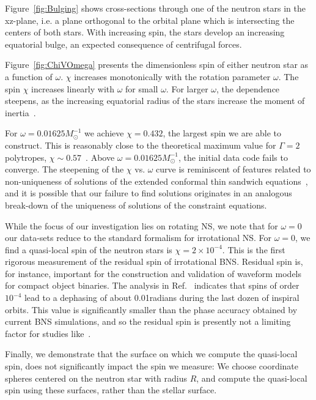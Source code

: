 {Figure~\ref{fig:Bulging} shows cross-sections through one of the neutron stars
in the xz-plane, i.e. a plane orthogonal to the orbital plane which is
intersecting the centers of both stars.  With increasing spin, the
stars develop an increasing equatorial bulge, an expected consequence of centrifugal forces. 

Figure~\ref{fig:ChiVOmega}
presents the dimensionless spin of either neutron star as a function
of $\omega$.  $\chi$ increases monotonically with the rotation
parameter $\omega$.  
The spin $\chi$ increases
linearly with $\omega$ for small $\omega$.  For larger $\omega$, the
dependence steepens, as the increasing equatorial radius of the stars
increase the moment of inertia~\cite{Worley:2008cb}. 

For
$\omega=0.01625 M_{\odot}^{-1}$ we achieve $\chi=0.432$, the largest spin we are
able to construct.  This is reasonably close to the theoretical
maximum value for $\Gamma=2$ polytropes,
$\chi\sim 0.57$~\cite{Ansorg:2003br}.  Above $\omega=0.01625 M_{\odot}^{-1}$,
the initial data code fails to converge.  The steepening of the $\chi$
vs. $\omega$ curve is reminiscent of features related to
non-uniqueness of solutions of the extended conformal thin sandwich
equations~\cite{Lovelace2008,Pfeiffer-York:2005,Baumgarte2007,Walsh2007},
and it is possible that our failure to find solutions originates in an analogous
break-down of the uniqueness of solutions of the constraint equations.


While the focus of our investigation lies on rotating NS, we
  note that for $\omega=0$ our data-sets reduce to the standard
  formalism for irrotational NS.  For $\omega=0$, we find a
  quasi-local spin of the neutron stars is $\chi=2\times 10^{-4}$.
  This is the first rigorous measurement of the residual spin of
  irrotational BNS.  Residual spin is, for instance, important for the
  construction and validation of waveform models for compact object
  binaries.  The analysis in Ref.~\cite{Boyle2007} indicates that
  spins of order $10^{-4}$ lead to a dephasing of about 0.01radians
  during the last dozen of inspiral orbits.  This value is
  significantly smaller than the phase accuracy obtained by current
  BNS simulations, and so the residual spin is presently not a
  limiting factor for studies like~\cite{Bernuzzi:2014owa,Baiotti2011,Baiotti:2010xh}.




Finally, we demonstrate that the surface on which we
compute the quasi-local spin, does not significantly impact the spin
we measure: We choose coordinate spheres centered on the neutron star
with radius $R$, and compute the quasi-local spin using these
surfaces,
rather than the stellar surface.

}
